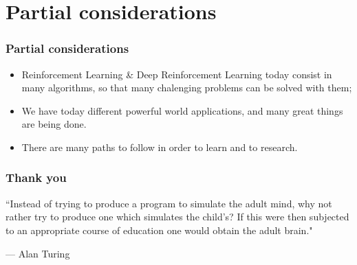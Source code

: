 \documentclass{beamer}
\begin{document}
    \section{Partial considerations}

        \begin{frame}
            \frametitle{Partial considerations}
        
            \begin{itemize}
                \item Reinforcement Learning \& Deep Reinforcement Learning today consist in many algorithms, so that many chalenging problems can be solved with them;
                \item We have today different powerful world applications, and many great things are being done.
                \item There are many paths to follow in order to learn and to research.
            \end{itemize}
        
        \end{frame}

        \begin{frame}
            \frametitle{Thank you}
        
            \epigraph{``Instead of trying to produce a program to simulate the adult mind, why not rather try to produce one which simulates the child's? If this were then subjected to an appropriate course of education one would obtain the adult brain."}{--- \textup{Alan Turing}}
        
        \end{frame}
    
\end{document}
